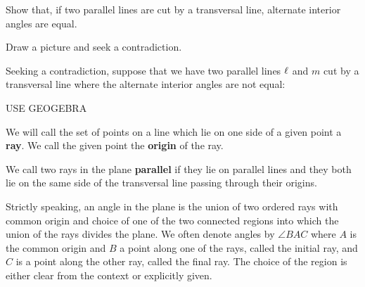\documentclass{ximera}
\begin{document}
\begin{question}
\label{24} Show that, if two parallel lines are cut by a
transversal line, alternate interior angles are equal.
\begin{solution}
\begin{hint}
Draw a picture and seek a contradiction.
\end{hint}
\begin{freeResponse}
Seeking a contradiction, suppose that we have two parallel lines $\ell$
and $m$ cut by a transversal line where the alternate interior angles are
not equal:

USE GEOGEBRA

\begin{image}
\end{image}
\end{freeResponse}
\end{solution}
\end{question}

\begin{definition} 
We will call the set of points on a line which lie on one side of a
given point a \textbf{ray}.  We call the given point the
\textbf{origin} of the ray.
\end{definition}

\begin{definition}
We call two rays in the plane \textbf{parallel} if they lie on
parallel lines and they both lie on the same side of the transversal
line passing through their origins.
\end{definition}

Strictly speaking, an angle in the plane is the union of two ordered
rays with common origin and choice of one of the two connected regions
into which the union of the rays divides the plane. We often denote
angles by $\angle BAC$ where $A$ is the common origin and $B$ a point
along one of the rays, called the initial ray, and $C$ is a point
along the other ray, called the final ray.  The choice of the region
is either clear from the context or explicitly given.
\end{document}
